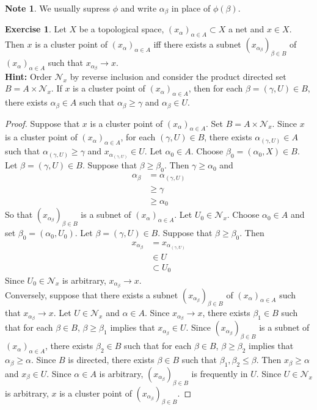 \documentclass[12pt]{amsart}
\theoremstyle{definition}
\newtheorem{note}[definition]{Note}
\newtheorem{ex}[definition]{Exercise}
\newcommand{\al}{\alpha}
\newcommand{\gam}{\gamma}
\newcommand{\be}{\beta}
\newcommand{\MN}{\mathcal{N}}
\newcommand{\lex}[1]{\label{ex:#1}}
\begin{document}
	\begin{note}
		We usually supress $\phi$ and write $\al_{\be}$ in place of ${\phi(\beta)}$.
	\end{note}
	
	\begin{ex} \lex{33015}
	Let $X$ be a topological space, $(x_{\al})_{\al \in A} \subset X$ a net and $x \in X$. Then $x$ is a cluster point of $(x_{\al})_{\al \in A}$ iff there exists a subnet $(x_{\al_{\be}})_{\be \in B}$ of $(x_{\al})_{\al \in A}$ such that $x_{\al_{\be}} \rightarrow x$. \\
	\textbf{Hint:} Order $\MN_x$ by reverse inclusion and consider the product directed set $B = A \times \MN_x$. If $x$ is a cluster point of $(x_{\al})_{\al \in A}$, then for each $\be = (\gam, U) \in B$, there exists $\al_{\be} \in A$ such that $\al_{\be} \geq \gam$ and $\al_{\be} \in U$. 
	\end{ex}

	\begin{proof}
		Suppose that $x$ is a cluster point of $(x_{\al})_{\al \in A}$. Set $B = A \times \MN_x$. Since $x$ is a cluster point of $(x_{\al})_{\al \in A}$, for each $(\gam, U) \in B$, there exists $\al_{(\gam, U)} \in A$ such that $\al_{(\gam, U)} \geq \gam$ and $x_{\al_{(\gam, U)}} \in U$. Let $\al_0 \in A$. Choose $\be_0 = (\al_0, X) \in B$. Let $\be = (\gam, U) \in B$. Suppose that $\be \geq \be_0$. Then $\gam \geq \al_0$ and 
		\begin{align*}
			\al_{\be}
			&= \al_{(\gam, U)} \\
			& \geq \gam \\
			& \geq \al_0
		\end{align*}
		So that $(x_{\al_{\be}})_{\be \in B}$ is a subnet of $(x_{\al})_{\al \in A}$. Let $U_0 \in \MN_x$. Choose $\al_0 \in A$ and set $\be_0 = (\al_0, U_0)$. Let $\be = (\gam, U) \in B$. Suppose that $\be \geq \be_0$. Then 
		\begin{align*}
			x_{\al_{\be}} 
			&= x_{\al_{(\gam, U)}} \\
			& \in U \\
			&\subset U_0
		\end{align*} 
		Since $U_0 \in \MN_x$ is arbitrary, $x_{\al_{\be}} \rightarrow x$. \\
		Conversely, suppose that there exists a subnet $(x_{\al_{\be}})_{\be \in B}$ of $(x_{\al})_{\al \in A}$ such that $x_{\al_{\be}} \rightarrow x$. Let $U \in \MN_x$ and $\al \in A$. Since $x_{\al_{\be}} \rightarrow x$, there exists $\be_1 \in B$ such that for each $\be \in B$, $\be \geq \be_1$ implies that $x_{\al_{\be}} \in U$. Since $(x_{\al_{\be}})_{\be \in B}$ is a subnet of $(x_{\al})_{\al \in A}$, there exists $\be_2 \in B$ such that for each $\be \in B$, $\be \geq \be_2$ implies that $\al_{\be} \geq \al$. Since $B$ is directed, there exists $\be \in B$ such that $\be_1, \be_2 \leq \be$. Then $x_{\be} \geq \al$ and $x_{\be} \in U$. Since $\al \in A$ is arbitrary,  $(x_{\al_{\be}})_{\be \in B}$ is frequently in $U$. Since $U \in \MN_x$ is arbitrary, $x$ is a cluster point of $(x_{\al_{\be}})_{\be \in B}$. 
	\end{proof}
	
\end{document}
